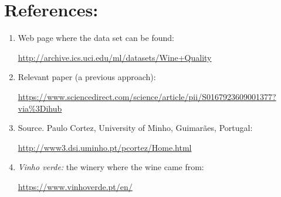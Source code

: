 \documentclass[10pt]{article}
\begin{document}
\section{References:}
\begin{enumerate}
  \item Web page where the data set can be found:

  \href{http://archive.ics.uci.edu/ml/datasets/Wine+Quality}{ http://archive.ics.uci.edu/ml/datasets/Wine+Quality}

  \item Relevant paper (a previous approach):

  \href{https://www.sciencedirect.com/science/article/pii/S0167923609001377?via\%3Dihub}{ https://www.sciencedirect.com/science/article/pii/S0167923609001377?via\%3Dihub}

  \item Source. Paulo Cortez, University of Minho, Guimarães, Portugal:

  \href{http://www3.dsi.uminho.pt/pcortez/Home.html}{ http://www3.dsi.uminho.pt/pcortez/Home.html}

  \item \textit{Vinho verde:} the winery where the wine came from:

  \href{https://www.vinhoverde.pt/en/}{ https://www.vinhoverde.pt/en/}

\end{enumerate}
\end{document}
